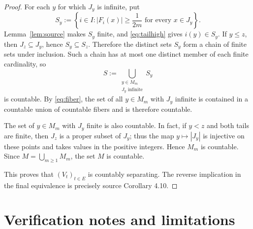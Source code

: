 \documentclass[11pt]{article}
\begin{document}
\begin{proof}
For each $y$ for which $J_y$ is infinite, put
\[
 S_y:=\left\{i\in I:|F_i(x)|\geq\frac1{2m}
                    \text{ for every }x\in J_y\right\}.
\]
Lemma~\ref{lem:source} makes $S_y$ finite, and \eqref{eq:tailhigh} gives
$i(y)\in S_y$. If $y\leq z$, then $J_z\subseteq J_y$, hence
$S_y\subseteq S_z$. Therefore the distinct sets $S_y$ form a chain of
finite sets under inclusion. Such a chain has at most one distinct member of
each finite cardinality, so
\[
 S:=\bigcup_{\substack{y\in M_m\\J_y\text{ infinite}}}S_y
\]
is countable. By \eqref{eq:fiber}, the set of all $y\in M_m$ with $J_y$
infinite is contained in a countable union of countable fibers and is
therefore countable.

The set of $y\in M_m$ with $J_y$ finite is also countable. In fact, if
$y<z$ and both tails are finite, then $J_z$ is a proper subset of $J_y$;
thus the map $y\mapsto |J_y|$ is injective on these points and takes values
in the positive integers. Hence $M_m$ is countable. Since
$M=\bigcup_{m\geq1}M_m$, the set $M$ is countable.

This proves that $(V_t)_{t\in E}$ is countably separating. The reverse
implication in the final equivalence is precisely source Corollary 4.10.
\end{proof}

\section{Verification notes and limitations}
\end{document}
